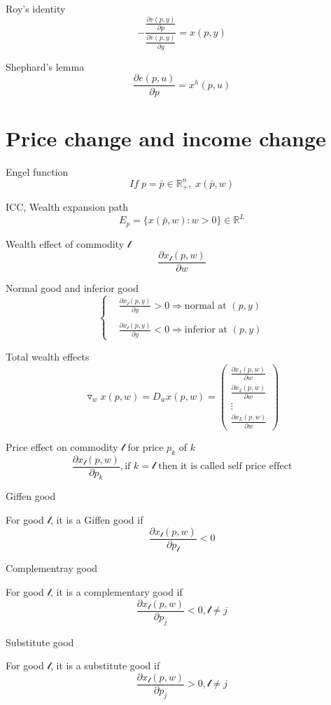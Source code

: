 \documentclass{article}
\begin{document}
Roy's identity
$$-\frac{\frac{\partial{v(p,y)}}{\partial{p}}}{\frac{\partial{v(p,y)}}{\partial{y}}}=x(p,y)$$

Shephard's lemma
$$\frac{\partial{}e(p,u)}{\partial p}=x^{h}(p,u)$$

\section{Price change and income change}

Engel function
$$If\;p=\bar{p}\in \mathbb{R}_{+}^{n},\;x(\bar{p},w)$$

ICC, Wealth expansion path
$$E_{p}=\{x(\bar{p},w):w>0\}\in \mathbb{R}^{L}$$

Wealth effect of commodity $\mathscr{l}$ 
$$\frac{\partial x_\mathscr{l}(p,w)}{\partial w}$$

Normal good and inferior good
$$\begin{cases}&\frac{\partial x_\mathscr{l}(p,y)}{\partial y}>0 \Rightarrow \text{normal at }(p,y) \\
\\&\frac{\partial x_\mathscr{l}(p,y)}{\partial y}<0 \Rightarrow \text{inferior at }(p,y)\end{cases}$$

Total wealth effects
$$\triangledown_{w}x(p,w)= D_{w}x(p,w)=\begin{pmatrix}\frac{\partial x_{1}(p,w)}{\partial w} \\ \frac{\partial x_{2}(p,w)}{\partial w} \\ \vdots \\ \frac{\partial x_{L}(p,w)}{\partial w}\end{pmatrix}$$

Price effect on commodity $\mathscr{l}$ for price $p_{k}$ of $k$
$$\frac{\partial x_\mathscr{l}(p,w)}{\partial p_{k}}, \text{if }\mathscr{}k=\mathscr{l} \text{ then it is called self price effect}$$

Giffen good

For good $\mathscr{l}$, it is a Giffen good if 
$$\frac{\partial x_\mathscr{l}(p,w)}{\partial p_\mathscr{l}}<0$$

Complementray good

For good $\mathscr{l}$, it is a complementary good if 
$$\frac{\partial x_\mathscr{l}(p,w)}{\partial p_{j}}<0,\mathscr{l}\neq j$$

Substitute good

For good $\mathscr{l}$, it is a substitute good if 
$$\frac{\partial x_\mathscr{l}(p,w)}{\partial p_{j}}>0,\mathscr{l}\neq j$$
\end{document}
